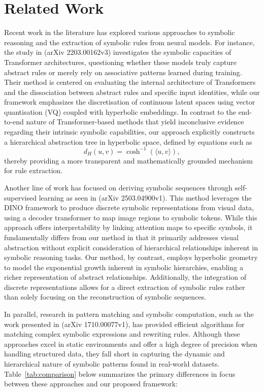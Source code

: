 \documentclass{article}
\begin{document}
\section{Related Work}
Recent work in the literature has explored various approaches to symbolic reasoning and the extraction of symbolic rules from neural models. For instance, the study in (arXiv 2203.00162v3) investigates the symbolic capacities of Transformer architectures, questioning whether these models truly capture abstract rules or merely rely on associative patterns learned during training. Their method is centered on evaluating the internal architecture of Transformers and the dissociation between abstract rules and specific input identities, while our framework emphasizes the discretisation of continuous latent spaces using vector quantisation (VQ) coupled with hyperbolic embeddings. In contrast to the end-to-end nature of Transformer-based methods that yield inconclusive evidence regarding their intrinsic symbolic capabilities, our approach explicitly constructs a hierarchical abstraction tree in hyperbolic space, defined by equations such as 
\[
d_{H}(u,v)=\cosh^{-1}(\langle u,v \rangle),
\]
thereby providing a more transparent and mathematically grounded mechanism for rule extraction.

Another line of work has focused on deriving symbolic sequences through self-supervised learning as seen in (arXiv 2503.04900v1). This method leverages the DINO framework to produce discrete symbolic representations from visual data, using a decoder transformer to map image regions to symbolic tokens. While this approach offers interpretability by linking attention maps to specific symbols, it fundamentally differs from our method in that it primarily addresses visual abstraction without explicit consideration of hierarchical relationships inherent in symbolic reasoning tasks. Our method, by contrast, employs hyperbolic geometry to model the exponential growth inherent in symbolic hierarchies, enabling a richer representation of abstract relationships. Additionally, the integration of discrete representations allows for a direct extraction of symbolic rules rather than solely focusing on the reconstruction of symbolic sequences.

In parallel, research in pattern matching and symbolic computation, such as the work presented in (arXiv 1710.00077v1), has provided efficient algorithms for matching complex symbolic expressions and rewriting rules. Although these approaches excel in static environments and offer a high degree of precision when handling structured data, they fall short in capturing the dynamic and hierarchical nature of symbolic patterns found in real-world datasets. Table~\ref{tab:comparison} below summarizes the primary differences in focus between these approaches and our proposed framework:
\end{document}
